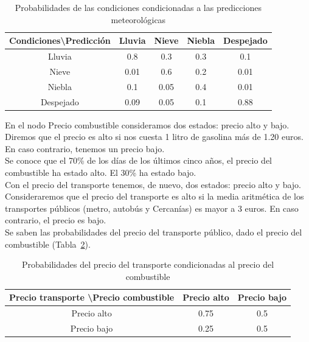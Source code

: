 \documentclass[12pt,a4paper,twoside,openright,titlepage,final]{article}
\begin{document}
\begin{table}[htbp!]
	\centering
	\caption{Probabilidades de las condiciones condicionadas a las predicciones meteorológicas}
	\label{tbl:condicionadas}
	\begin{tabular}{@{}ccccc@{}}
		\toprule
		Condiciones\textbackslash Predicción & Lluvia & Nieve & Niebla & Despejado \\ \midrule
		Lluvia                               & 0.8    & 0.3   & 0.3    & 0.1       \\
		Nieve                                & 0.01   & 0.6   & 0.2    & 0.01      \\
		Niebla                               & 0.1    & 0.05  & 0.4    & 0.01      \\
		Despejado                            & 0.09   & 0.05  & 0.1    & 0.88      \\ \bottomrule
	\end{tabular}
\end{table} 

En el nodo Precio combustible consideramos dos estados: precio alto y bajo. Diremos que el precio es alto si nos cuesta 1 litro de gasolina más de 1.20 euros. En caso contrario, tenemos un precio bajo.\\

Se conoce que el 70\% de los días de los últimos cinco años, el precio del combustible ha estado alto. El 30\% ha estado bajo.\\

Con el precio del transporte tenemos, de nuevo, dos estados: precio alto y bajo. Consideraremos que el precio del transporte es alto si la media aritmética de los transportes públicos (metro, autobús y Cercanías) es mayor a 3 euros. En caso contrario, el precio es bajo.\\

Se saben las probabilidades del precio del transporte público, dado el precio del combustible (Tabla~\ref{tbl:condicionadas_2}).

\begin{table}[htbp!]
	\centering
	\caption{Probabilidades del precio del transporte condicionadas al precio del combustible}
	\label{tbl:condicionadas_2}
	\begin{tabular}{@{}ccc@{}}
		\toprule
		Precio transporte \textbackslash Precio combustible & Precio alto & Precio bajo \\ \midrule
		Precio alto                                         & 0.75        & 0.5         \\
		Precio bajo                                         & 0.25        & 0.5         \\ \bottomrule
	\end{tabular}
\end{table}
\end{document}
